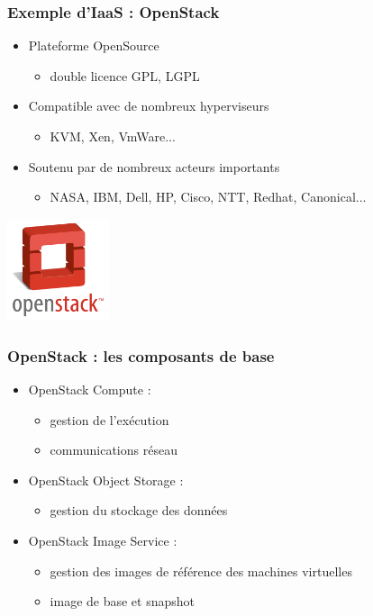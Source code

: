 \begin{frame}
  \frametitle{Exemple d'IaaS : OpenStack}
  \begin{itemize}
  \item Plateforme OpenSource
  \begin{itemize}
    \item double licence GPL, LGPL
  \end{itemize}

  \item Compatible avec de nombreux hyperviseurs
  \begin{itemize}
    \item KVM, Xen, VmWare...
  \end{itemize}

  \item Soutenu par de nombreux acteurs importants
  \begin{itemize}
  \item NASA, IBM, Dell, HP, Cisco, NTT, Redhat, Canonical...
  \end{itemize}
  \end{itemize}
  \includegraphics[height=3cm]{../illustration/logo-openstack.png}       
\end{frame}

\begin{frame}
  \frametitle{OpenStack : les composants de base}
  \begin{itemize}
  \item OpenStack Compute :
\begin{itemize}
\item gestion de l'exécution
\item communications réseau
\end{itemize}

  \item OpenStack Object Storage : \begin{itemize}
\item gestion du stockage des données
\end{itemize}

  \item OpenStack Image Service : \begin{itemize}
\item gestion des images de référence des machines virtuelles
\item image de base et snapshot
\end{itemize}

  \end{itemize}
\end{frame}



